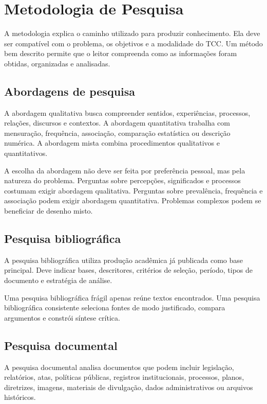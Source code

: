 \chapter{Metodologia de Pesquisa}

A metodologia explica o caminho utilizado para produzir conhecimento. Ela deve ser compatível com o problema, os objetivos e a modalidade do TCC. Um método bem descrito permite que o leitor compreenda como as informações foram obtidas, organizadas e analisadas.

\section{Abordagens de pesquisa}

A abordagem qualitativa busca compreender sentidos, experiências, processos, relações, discursos e contextos. A abordagem quantitativa trabalha com mensuração, frequência, associação, comparação estatística ou descrição numérica. A abordagem mista combina procedimentos qualitativos e quantitativos.

A escolha da abordagem não deve ser feita por preferência pessoal, mas pela natureza do problema. Perguntas sobre percepções, significados e processos costumam exigir abordagem qualitativa. Perguntas sobre prevalência, frequência e associação podem exigir abordagem quantitativa. Problemas complexos podem se beneficiar de desenho misto.

\section{Pesquisa bibliográfica}

A pesquisa bibliográfica utiliza produção acadêmica já publicada como base principal. Deve indicar bases, descritores, critérios de seleção, período, tipos de documento e estratégia de análise.

Uma pesquisa bibliográfica frágil apenas reúne textos encontrados. Uma pesquisa bibliográfica consistente seleciona fontes de modo justificado, compara argumentos e constrói síntese crítica.

\section{Pesquisa documental}

A pesquisa documental analisa documentos que podem incluir legislação, relatórios, atas, políticas públicas, registros institucionais, processos, planos, diretrizes, imagens, materiais de divulgação, dados administrativos ou arquivos históricos.

